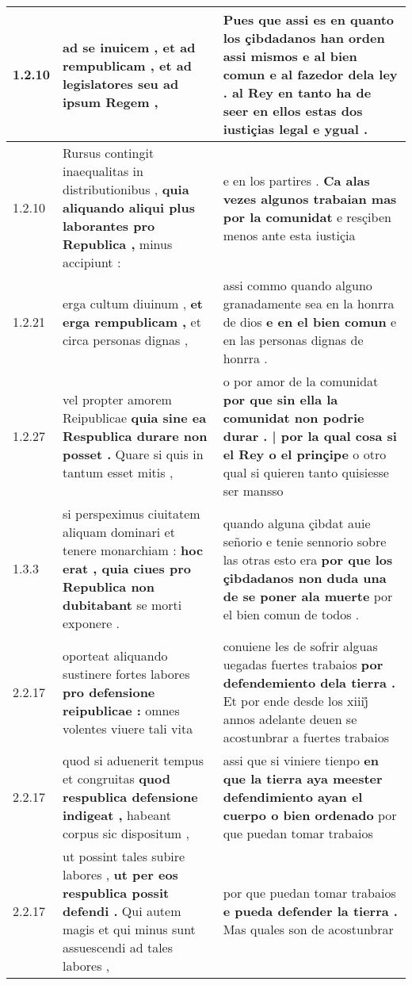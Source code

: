 \begin{tabular}{|p{1cm}|p{6.5cm}|p{6.5cm}|}

\hline
1.2.10 & ad se inuicem , \textbf{ et ad rempublicam , } et ad legislatores seu ad ipsum Regem , & Pues que assi es en quanto los çibdadanos han orden assi mismos \textbf{ e al bien comun e al fazedor dela ley . } al Rey en tanto ha de seer en ellos estas dos iustiçias legal e ygual . \\\hline
1.2.10 & Rursus contingit inaequalitas in distributionibus , \textbf{ quia aliquando aliqui plus laborantes pro Republica , } minus accipiunt : & e en los partires . \textbf{ Ca alas vezes algunos trabaian mas por la comunidat } e resçiben menos ante esta iustiçia \\\hline
1.2.21 & erga cultum diuinum , \textbf{ et erga rempublicam , } et circa personas dignas , & assi commo quando alguno granadamente sea en la honrra de dios \textbf{ e en el bien comun } e en las personas dignas de honrra . \\\hline
1.2.27 & vel propter amorem Reipublicae \textbf{ quia sine ea Respublica durare non posset . } Quare si quis in tantum esset mitis , & o por amor de la comunidat \textbf{ por que sin ella la comunidat non podrie durar . | por la qual cosa si el Rey o el prinçipe } o otro qual si quieren tanto quisiesse ser mansso \\\hline
1.3.3 & si perspeximus ciuitatem aliquam dominari et tenere monarchiam : \textbf{ hoc erat , quia ciues pro Republica non dubitabant } se morti exponere . & quando alguna çibdat auie señorio e tenie sennorio sobre las otras esto era \textbf{ por que los çibdadanos non duda una de se poner ala muerte } por el bien comun de todos . \\\hline
2.2.17 & oporteat aliquando sustinere fortes labores \textbf{ pro defensione reipublicae : } omnes volentes viuere tali vita & conuiene les de sofrir alguas uegadas fuertes trabaios \textbf{ por defendemiento dela tierra . } Et por ende desde los xiiij̊ annos adelante deuen se acostunbrar a fuertes trabaios \\\hline
2.2.17 & quod si aduenerit tempus et congruitas \textbf{ quod respublica defensione indigeat , } habeant corpus sic dispositum , & assi que si viniere tienpo \textbf{ en que la tierra aya meester defendimiento ayan el cuerpo o bien ordenado } por que puedan tomar trabaios \\\hline
2.2.17 & ut possint tales subire labores , \textbf{ ut per eos respublica possit defendi . } Qui autem magis et qui minus sunt assuescendi ad tales labores , & por que puedan tomar trabaios \textbf{ e pueda defender la tierra . } Mas quales son de acostunbrar \\\hline

\end{tabular}
